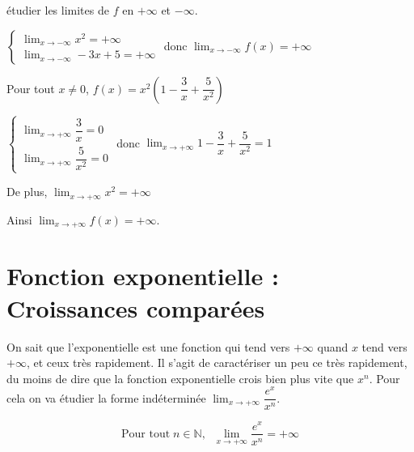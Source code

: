 \documentclass[french]{book}
\newcommand{\ds}{\displaystyle}
\newcommand{\limpinf}[1][x]{\ds\lim_{#1\rightarrow +\infty}}
\newcommand{\limminf}[1][x]{\ds\lim_{#1\rightarrow -\infty}}
\begin{document}
\'etudier les limites de $f$ en $+\infty$ et $-\infty$.


$\left\lbrace
\begin{array}{l}
\limminf x^{2}=+\infty \\
\limminf -3x+5=+\infty
\end{array}
\right.$
donc $\limminf f(x)=+\infty$

Pour tout $x\neq0$, $f(x)=x^{2}\left(1-\dfrac{3}{x}+\dfrac{5}{x^{2}}\right)$

$\left\lbrace
\begin{array}{l}
\limpinf \dfrac{3}{x}=0\\
\limpinf \dfrac{5}{x^{2}}=0
\end{array}
\right.$
donc $\limpinf 1-\dfrac{3}{x}+\dfrac{5}{x^{2}}=1$

De plus, $\limpinf x^{2}=+\infty$

Ainsi $\limpinf f(x)=+\infty$.

\newpage
\section{Fonction exponentielle : Croissances comparées}
On sait que l'exponentielle est une fonction qui tend vers $+ \infty$ quand $x$ tend vers $+ \infty$, et ceux très rapidement.  Il s'agit de caractériser un peu ce très rapidement, du moins de dire que la fonction exponentielle crois bien plus vite que $x^n$. Pour cela on va étudier la forme indéterminée $\limpinf \dfrac{e^x}{x^n} $. 

\begin{thm}
$$ \text{Pour tout} \; n \in \mathbb{N}, \;\;\limpinf \dfrac{e^x}{x^n}= +\infty$$
\end{thm} 
\end{document}
